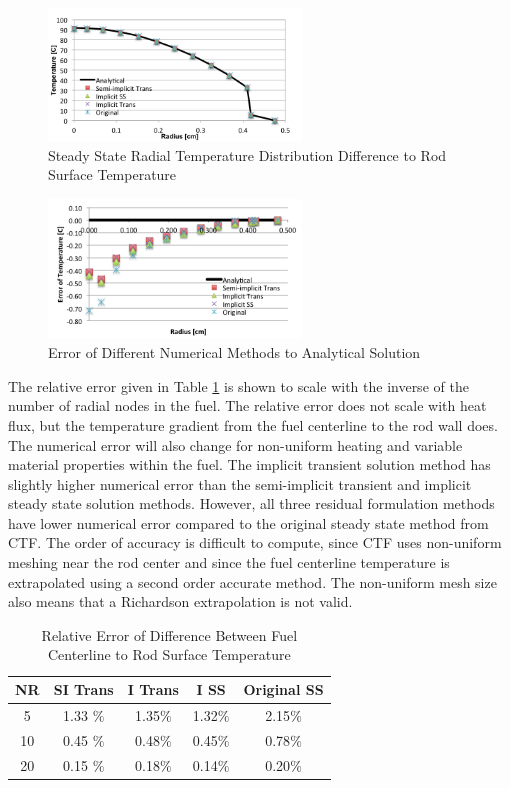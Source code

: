 \begin{figure}[!h]
	\centering
	\includegraphics[width=0.60\textwidth]{images/Rod_Profile_Summary.png}
	\caption{Steady State Radial Temperature Distribution Difference to Rod Surface Temperature }
	\label{fig:Rod_Profile_Summary}
\end{figure}

\begin{figure}[!h]
	\centering
	\includegraphics[width=0.60\textwidth]{images/Rod_Profile_Errors.png}
	\caption{Error of Different Numerical Methods to Analytical Solution}
	\label{fig:Rod_Profile_Errors}
\end{figure}

The relative error given in Table \ref{table:heating:errors} is shown to
scale with the inverse of the number of radial nodes in the fuel. The relative error does not scale with heat
flux, but the temperature gradient from the fuel centerline to the rod wall
does. The numerical error will also change for non-uniform heating and variable
material properties within the fuel. The implicit transient solution method has
slightly higher numerical error than the semi-implicit transient and implicit
steady state solution methods. However, all three residual formulation methods
have lower numerical error compared to the original steady state method from
CTF. The order of accuracy is difficult to compute, since CTF uses non-uniform
meshing near the rod center and since the fuel centerline temperature is
extrapolated using a second order accurate method. The non-uniform mesh size
also means that a Richardson extrapolation is not valid.

\begin{table}[h]
\center
\caption{Relative Error of Difference Between Fuel Centerline to Rod Surface Temperature}
\label{table:heating:errors}
\begin{tabular}{|c|c|c|c|c|}
\hline
NR &	SI Trans	&	I Trans	& I SS & Original SS	\\ \hline
5  & 1.33 $ \% $ & 1.35$ \% $ & 1.32$ \% $ & 2.15$ \% $ \\ \hline
10 & 0.45 $ \% $ & 0.48$ \% $ & 0.45$ \% $ & 0.78$ \% $ \\ \hline
20 & 0.15 $ \% $ & 0.18$ \% $ & 0.14$ \% $ & 0.20$ \% $ \\ \hline
\end{tabular}
\end{table}


